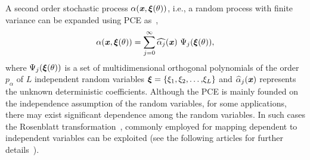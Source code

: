 \documentclass[letter,1p,11pt,oneside,onecolumn,sort&compress]{elsarticle}
\begin{document}



A second order stochastic process $\alpha(\textbf{\textit{x}}, \mbox{\boldmath $\xi$}(\theta))$, i.e., a random process with finite variance %
can be expanded using PCE as~\cite{ghanemSFEM1991},
\begin{equation}
\alpha(\textbf{\textit{x}}, \mbox{\boldmath $\xi$}(\theta)) = \sum^{\infty }_{j=0}{{ \widehat{\alpha_j}}(\textbf{\textit{x}}) \ {\Psi }_{
j}{\rm (}{\mbox{\boldmath $\xi$}(\theta)} {\rm )}},
\label{eq:pce}
\end{equation}
where ${\Psi }_j (\mbox{\boldmath $\xi$}(\theta))$ is a set of multidimensional orthogonal polynomials of the order $p_{\alpha}$ of $L$ independent random variables $\mbox{\boldmath $\xi$} = \{{\xi}_{1}, {\xi}_{2},{\dots,}{\xi}_{L} \} $ and ${\widehat{\alpha}}_j(\textbf{\textit{x}})$ represents the unknown deterministic coefficients.
Although the PCE is mainly founded on the independence assumption of the random variables, for some applications, there may exist significant dependence among the random variables. In such cases the Rosenblatt transformation~\cite{rosenblatt1952remarks}, commonly employed for mapping dependent to independent variables can be exploited (see the following articles for further details~\cite{soize2004physical,rahman2018polynomial}).
\end{document}
